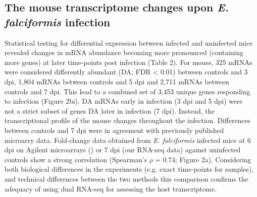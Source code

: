 \documentclass{bmcart}
\begin{document}
\subsection*{The mouse transcriptome changes upon \emph{E. falciformis} infection}
Statistical testing for differential expression between infected and uninfected mice revealed changes in mRNA abundance becoming more pronounced (containing more genes) at later time-points post infection (Table 2). For mouse, 325 mRNAs were considered differently abundant (DA; FDR < 0.01) between controls and 3 dpi, 1,804 mRNAs between controls and 5 dpi and 2,711 mRNAs between controls and 7 dpi. This lead to a combined set of 3,453 unique genes responding to infection (Figure 2bi). DA mRNAs early in infection (3 dpi and 5 dpi) were not a strict subset of genes DA later in infection (7 dpi). Instead, the transcriptional profile of the mouse changes throughout the infection. Differences between controls and 7 dpi were in agreement with previously published microarry data. Fold-change data obtained from \textit{E. falciformis} infected mice at 6 dpi on Agilent microarrays (\cite{schmidt12}) or 7 dpi (our RNA-seq data) against uninfected controls show a strong correlation (Spearman's $\rho$ = 0.74; Figure 2a). Considering both biological differences in the experiments (e.g. exact time-points for samples), and technical differences between the two methods this comparison confirms the adequacy of using dual RNA-seq for assessing the host transcriptome.
\end{document}
